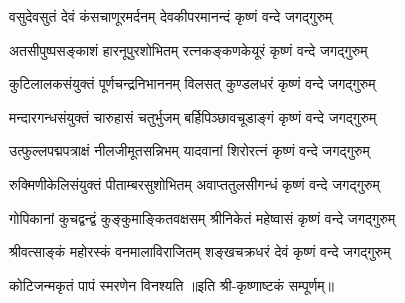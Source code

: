 
\twolineshloka
{वसुदेवसुतं देवं कंसचाणूरमर्दनम्}
{देवकीपरमानन्दं कृष्णं वन्दे जगद्गुरुम्}

\twolineshloka
{अतसीपुष्पसङ्काशं हारनूपुरशोभितम्}
{रत्नकङ्कणकेयूरं कृष्णं वन्दे जगद्गुरुम्}

\twolineshloka
{कुटिलालकसंयुक्तं पूर्णचन्द्रनिभाननम्}
{विलसत् कुण्डलधरं कृष्णं वन्दे जगद्गुरुम्}

\twolineshloka
{मन्दारगन्धसंयुक्तं चारुहासं चतुर्भुजम्}
{बर्हिपिञ्छावचूडाङ्गं कृष्णं वन्दे जगद्गुरुम्}

\twolineshloka
{उत्फुल्लपद्मपत्राक्षं नीलजीमूतसन्निभम्}
{यादवानां शिरोरत्नं कृष्णं वन्दे जगद्गुरुम्}

\twolineshloka
{रुक्मिणीकेलिसंयुक्तं पीताम्बरसुशोभितम्}
{अवाप्ततुलसीगन्धं कृष्णं वन्दे जगद्गुरुम्}

\twolineshloka
{गोपिकानां कुचद्वन्द्वं कुङ्कुमाङ्कितवक्षसम्}
{श्रीनिकेतं महेष्वासं कृष्णं वन्दे जगद्गुरुम्}

\twolineshloka
{श्रीवत्साङ्कं महोरस्कं वनमालाविराजितम्}
{शङ्खचक्रधरं देवं कृष्णं वन्दे जगद्गुरुम्}

{कोटिजन्मकृतं पापं स्मरणेन विनश्यति}
॥इति श्री-कृष्णाष्टकं सम्पूर्णम्॥